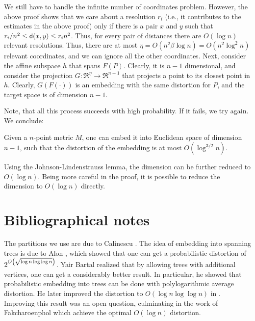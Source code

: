 We still have to handle the infinite number of coordinates problem.
However, the above proof shows that we care about a resolution $r_i$
(i.e., it contributes to the estimates in the above proof) only if
there is a pair $x$ and $y$ such that $r_i/n^2 \leq \mathsf{d}(x,y) \leq r_i
n^2$. Thus, for every pair of distances there are $O( \log n)$
relevant resolutions. Thus, there are at most $\eta = O(n^2 \beta \log
n) = O(n^2 \log^2 n)$ relevant coordinates, and we can ignore all the
other coordinates. Next, consider the affine subspace $h$ that spans
$F(P)$. Clearly, it is $n-1$ dimensional, and consider the projection
$G:\Re^\eta \rightarrow \Re^{n-1}$ that projects a point to its
closest point in $h$. Clearly, $G(F(\cdot))$ is an embedding with the
same distortion for $P$, and the target space is of dimension
$n-1$. 

Note, that all this process succeeds with high probability. If it
fails, we try again.  We conclude:

\begin{theorem}
    Given a $n$-point metric $M$, one can embed it into Euclidean
    space of dimension $n-1$, such that the distortion of the
    embedding is at most $O(\log^{3/2} n)$.
\end{theorem}

Using the Johnson-Lindenstrauss lemma, the dimension can be further
reduced to $O(\log n)$. Being more careful in the proof, it is
possible to reduce the dimension to $O(\log n)$ directly.



\section{Bibliographical notes}

The partitions we use are due to Calinescu \etal{}
\cite{ckr-aazep-04}. The idea of embedding into spanning trees is due
to Alon \etal{} \cite{akpw-gtgak-95}, which showed that one can get a
probabilistic distortion of $2^{O \pth{\sqrt{\log n \log \log n}}}$.
Yair Bartal realized that by allowing trees with additional vertices,
one can get a considerably better result. In particular, he showed
\cite{b-pamsa-96} that probabilistic embedding into trees can be done
with polylogarithmic average distortion. He later improved the
distortion to $O( \log n \log \log n)$ in \cite{b-aamtm-98}. Improving
this result was an open question, culminating in the work of
Fakcharoenphol \etal{} \cite{frt-tbaam-04} which achieve the optimal
$O(\log n)$ distortion.

